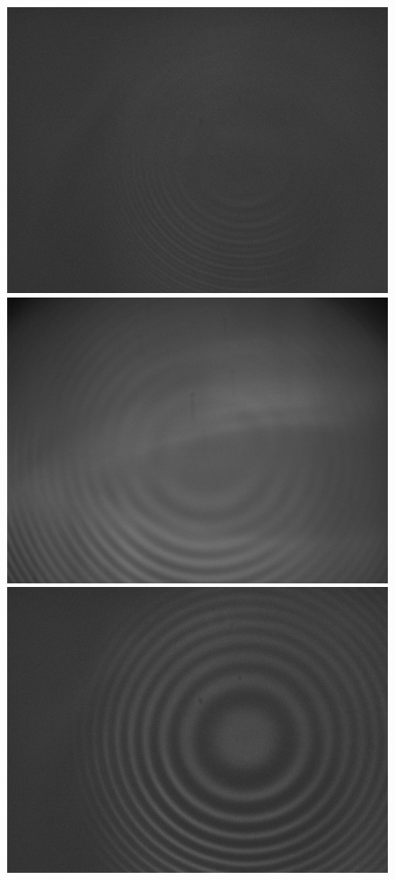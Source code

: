\documentclass{article}
\begin{document}
\begin{figure}[H]
    \includegraphics[scale = 0.1]{12.jpg}
    \includegraphics[scale = 0.1]{13.jpg}
    \includegraphics[scale = 0.1]{14.jpg}

\end{figure}
\end{document}
